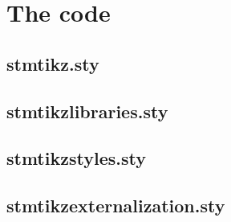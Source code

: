 \documentclass[%
  type=article,%
  layout=koma,%
  date=true,%
  hyperref=true,%
  listings=true,%
  tikz=false,%
]{stmtext}
\begin{document}
\newpage
\appendix

\section{The code}

\subsection{stmtikz.sty}



\newpage
\subsection{stmtikzlibraries.sty}



\newpage
\subsection{stmtikzstyles.sty}



\newpage
\subsection{stmtikzexternalization.sty}


\end{document}

